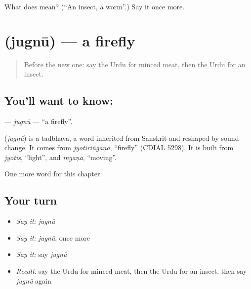 \begin{tcolorbox}[breakable,colback=teal!4,colframe=teal!35!black,title={Before you move on}]
What does  mean? (\textquotedblleft{}An insect, a worm\textquotedblright{}.) Say it once more.
\end{tcolorbox}
\section[\texorpdfstring{\ur{جگنو} (jugnū)}{جگنو (jugnū)}]{ (jugnū) — a firefly}

\label{lesson:UR-C235-jugnu}



\begin{quote}
Before the new one: say the Urdu for minced meat, then the Urdu for an insect.
\end{quote}

\subsection*{You'll want to know: }
\textbf{} — \emph{jugnū} — \textquotedblleft{}a firefly\textquotedblright{}.

\begin{cousinweb}
\textbf{} (\emph{jugnū}) is a tadbhava, a word inherited from Sanskrit and reshaped by sound change. It comes from \emph{jyotiriṅgaṇa}, \textquotedblleft{}firefly\textquotedblright{} (CDIAL 5298). It is built from \emph{jyotis}, \textquotedblleft{}light\textquotedblright{}, and \emph{iṅgaṇa}, \textquotedblleft{}moving\textquotedblright{}.
\end{cousinweb}

\begin{grammarlens}[title={What you've built}]
One more word for this chapter.
\end{grammarlens}

\subsection*{Your turn}
\begin{itemize}
\raggedright
  \item \emph{Say it:} \emph{jugnū}
  \item \emph{Say it:} \emph{jugnū}, once more
  \item \emph{Say it:} say \emph{jugnū}
  \item \emph{Recall:} say the Urdu for minced meat, then the Urdu for an insect, then say \emph{jugnū} again
\end{itemize}

